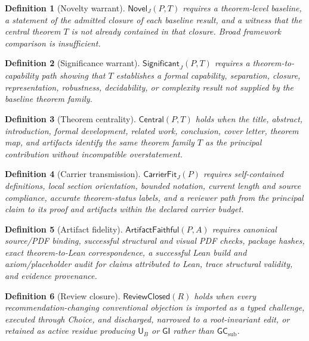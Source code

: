 \documentclass[10pt]{article}
\newtheorem{definition}{Definition}[section]
\newcommand{\GI}{\mathsf{GI}}
\newcommand{\UB}{\mathsf{U}_B}
\newcommand{\GCsub}{\mathsf{GC}_{\mathrm{sub}}}
\begin{document}
\begin{definition}[Novelty warrant]
$\mathsf{Novel}_J(P,T)$ requires a theorem-level baseline, a statement of the admitted closure of each baseline result, and a witness that the central theorem $T$ is not already contained in that closure.  Broad framework comparison is insufficient.
\end{definition}

\begin{definition}[Significance warrant]
$\mathsf{Significant}_J(P,T)$ requires a theorem-to-capability path showing that $T$ establishes a formal capability, separation, closure, representation, robustness, decidability, or complexity result not supplied by the baseline theorem family.
\end{definition}

\begin{definition}[Theorem centrality]
$\mathsf{Central}(P,T)$ holds when the title, abstract, introduction, formal development, related work, conclusion, cover letter, theorem map, and artifacts identify the same theorem family $T$ as the principal contribution without incompatible overstatement.
\end{definition}

\begin{definition}[Carrier transmission]
$\mathsf{CarrierFit}_J(P)$ requires self-contained definitions, local section orientation, bounded notation, current length and source compliance, accurate theorem-status labels, and a reviewer path from the principal claim to its proof and artifacts within the declared carrier budget.
\end{definition}

\begin{definition}[Artifact fidelity]
$\mathsf{ArtifactFaithful}(P,A)$ requires canonical source/PDF binding, successful structural and visual PDF checks, package hashes, exact theorem-to-Lean correspondence, a successful Lean build and axiom/placeholder audit for claims attributed to Lean, trace structural validity, and evidence provenance.
\end{definition}

\begin{definition}[Review closure]
$\mathsf{ReviewClosed}(R)$ holds when every recommendation-changing conventional objection is imported as a typed challenge, executed through Choice, and discharged, narrowed to a root-invariant edit, or retained as active residue producing $\UB$ or $\GI$ rather than $\GCsub$.
\end{definition}
\end{document}
